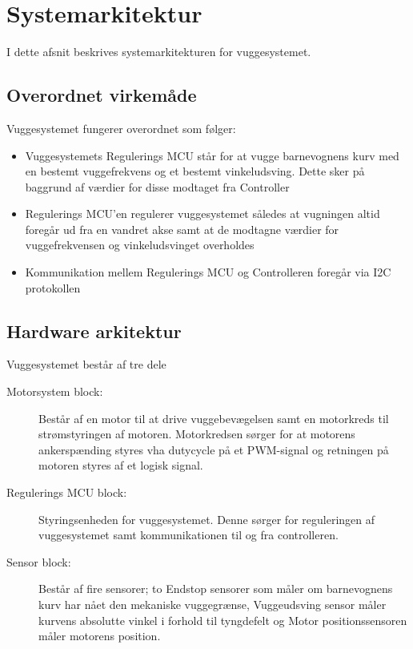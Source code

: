 \section{Systemarkitektur}

I dette afsnit beskrives systemarkitekturen for vuggesystemet.

\subsection*{Overordnet virkemåde}
Vuggesystemet fungerer overordnet som følger:
\begin{itemize}
	\item Vuggesystemets Regulerings MCU står for at vugge barnevognens kurv med en bestemt vuggefrekvens og et bestemt vinkeludsving. Dette sker på baggrund af værdier for disse modtaget fra Controller
	\item Regulerings MCU'en regulerer vuggesystemet således at vugningen altid foregår ud fra en vandret akse samt at de modtagne værdier for vuggefrekvensen og vinkeludsvinget overholdes  
	\item Kommunikation mellem Regulerings MCU og Controlleren foregår via I2C protokollen
\end{itemize}

\subsection{Hardware arkitektur}


Vuggesystemet består af tre dele
\begin{description}
\item[Motorsystem block:] Består af en motor til at drive vuggebevægelsen samt en motorkreds til strømstyringen af motoren. Motorkredsen sørger for at motorens ankerspænding styres vha dutycycle på et PWM-signal og retningen på motoren styres af et logisk signal.
\item[Regulerings MCU block:] Styringsenheden for vuggesystemet. Denne sørger for reguleringen af vuggesystemet samt kommunikationen til og fra controlleren.
\item[Sensor block:] Består af fire sensorer; to Endstop sensorer som måler om barnevognens kurv har nået den mekaniske vuggegrænse, Vuggeudsving sensor måler kurvens absolutte vinkel i forhold til tyngdefelt og Motor positionssensoren måler motorens position.
\end{description}

